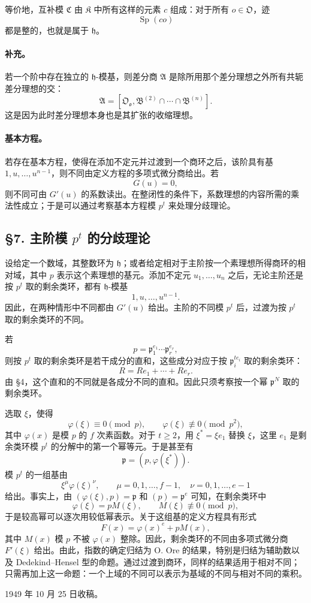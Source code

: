 等价地，互补模 \(\mathfrak C\) 由 \(\mathfrak K\) 中所有这样的元素 \(c\) 组成：对于所有 \(o\in\mathfrak O\)，迹
\[
        \operatorname{Sp}(co)
\]
都是整的，也就是属于 \(\mathfrak h\)。

\paragraph{补充。}
若一个阶中存在独立的 \(\mathfrak h\)-模基，则差分商 \(\mathfrak A\) 是除所用那个差分理想之外所有共轭差分理想的交：
\[
        \mathfrak A=[\mathfrak O_{\mathfrak o},
        \mathfrak B^{(2)}\cap\cdots\cap\mathfrak B^{(n)}].
\]
这是因为此时差分理想本身也是其扩张的收缩理想。

\paragraph{基本方程。}
若存在基本方程，使得在添加不定元并过渡到一个商环之后，该阶具有基 \(1,u,\ldots,u^{n-1}\)，则不同由定义方程的多项式微分商给出。若
\[
        G(u)=0,
\]
则不同可由 \(G'(u)\) 的系数读出。在整闭性的条件下，系数理想的内容所需的乘法性成立；于是可以通过考察基本方程模 \(p^t\) 来处理分歧理论。

\subsection*{§7. 主阶模 \(p^t\) 的分歧理论}

设给定一个数域，其整数环为 \(\mathfrak h\)；或者给定相对于主阶按一个素理想所得商环的相对域，其中 \(p\) 表示这个素理想的基元。添加不定元 \(u_1,\ldots,u_n\) 之后，无论主阶还是按 \(p^t\) 取的剩余类环，都有 \(\mathfrak h\)-模基
\[
        1,u,\ldots,u^{n-1}.
\]
因此，在两种情形中不同都由 \(G'(u)\) 给出。主阶的不同模 \(p^t\) 后，过渡为按 \(p^t\) 取的剩余类环的不同。

若
\[
        p=\mathfrak p_1^{e_1}
        \cdots\mathfrak p_r^{e_r},
\]
则按 \(p^t\) 取的剩余类环是若干成分的直和，这些成分对应于按 \(\mathfrak p_i^{te_i}\) 取的剩余类环：
\[
        R=Re_1+
        \cdots+Re_r.
\]
由 §4，这个直和的不同就是各成分不同的直和。因此只须考察按一个幂 \(\mathfrak p^N\) 取的剩余类环。

选取 \(\xi\)，使得
\[
        \varphi(\xi)\equiv0\pmod p,
        \qquad
        \varphi(\xi)\not\equiv0\pmod {p^2},
\]
其中 \(\varphi(x)\) 是模 \(p\) 的 \(f\) 次素函数。对于 \(t\ge2\)，用 \(\xi^*=\xi e_1\) 替换 \(\xi\)，这里 \(e_1\) 是剩余类环模 \(p^t\) 的分解中的第一个幂等元。于是甚至有
\[
        \mathfrak p=(p,\varphi(\xi^*)).
\]
模 \(p^t\) 的一组基由
\[
        \xi^{\mu}\varphi(\xi)^{\nu},
        \qquad
        \mu=0,1,\ldots,f-1,
        \quad
        \nu=0,1,\ldots,e-1
\]
给出。事实上，由 \((\varphi(\xi),p)=\mathfrak p\) 和 \((p)=\mathfrak p^e\) 可知，在剩余类环中
\[
        \varphi(\xi)=pM(\xi),
        \qquad M(\xi)\not\equiv0\pmod p,
\]
于是较高幂可以逐次用较低幂表示。关于这组基的定义方程具有形式
\[
        F(x)=\varphi(x)^e+pM(x),
\]
其中 \(M(x)\) 模 \(p\) 不被 \(\varphi(x)\) 整除。因此，剩余类环的不同由多项式微分商 \(F'(\xi)\) 给出。由此，指数的确定归结为 O. Ore 的结果，特别是归结为辅助数以及 Dedekind--Hensel 型的命题。通过过渡到商环，同样的结果适用于相对不同；只需再加上这一命题：一个上域的不同可以表示为基域的不同与相对不同的乘积。

\begin{center}
1949 年 10 月 25 日收稿。
\end{center}

